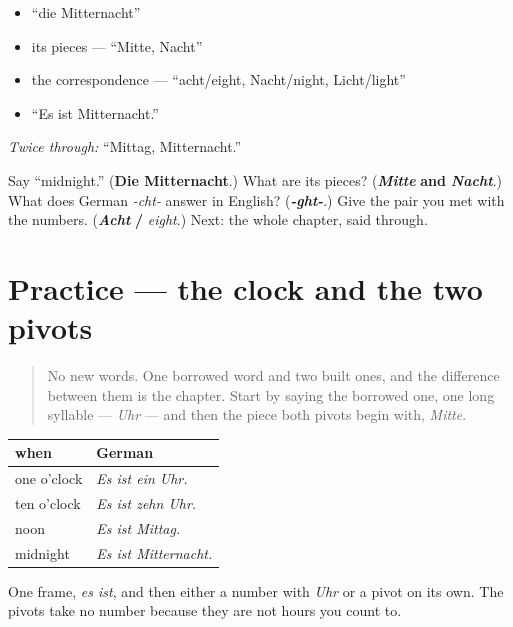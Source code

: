 \begin{itemize}
\raggedright
  \item \textquotedblleft{}die Mitternacht\textquotedblright{}
  \item its pieces — \textquotedblleft{}Mitte, Nacht\textquotedblright{}
  \item the correspondence — \textquotedblleft{}acht/eight, Nacht/night, Licht/light\textquotedblright{}
  \item \textquotedblleft{}Es ist Mitternacht.\textquotedblright{}
\end{itemize}

\emph{Twice through:} \textquotedblleft{}Mittag, Mitternacht.\textquotedblright{}

\begin{tcolorbox}[breakable,colback=teal!4,colframe=teal!35!black,title={Before you move on}]
Say \textquotedblleft{}midnight.\textquotedblright{} (\textbf{Die Mitternacht}.) What are its pieces? (\emph{\textbf{Mitte}} \textbf{and} \emph{\textbf{Nacht}}.) What does German \emph{-cht-} answer in English? (\emph{\textbf{-ght-}}.) Give the pair you met with the numbers. (\emph{\textbf{Acht}} \textbf{/} \emph{eight}.) Next: the whole chapter, said through.
\end{tcolorbox}
\section[Practice]{Practice — the clock and the two pivots}

\label{lesson:GE-C08-mittag-mitternacht}



\begin{quote}
No new words. One borrowed word and two built ones, and the difference between them is the chapter. Start by saying the borrowed one, one long syllable — \emph{Uhr} — and then the piece both pivots begin with, \emph{Mitte}.
\end{quote}

\begin{grammarlens}[title={Grammar Lens: three ways to say when}]
\noindent
\begin{tabularx}{\linewidth}{@{}>{\raggedright\arraybackslash}X>{\raggedright\arraybackslash}X@{}}
\toprule
\textbf{when} & \textbf{German} \\
\midrule
one o'clock & \emph{Es ist ein Uhr.} \\
ten o'clock & \emph{Es ist zehn Uhr.} \\
noon & \emph{Es ist Mittag.} \\
midnight & \emph{Es ist Mitternacht.} \\
\bottomrule
\end{tabularx}

One frame, \emph{es ist}, and then either a number with \emph{Uhr} or a pivot on its own. The pivots take no number because they are not hours you count to.
\end{grammarlens}

